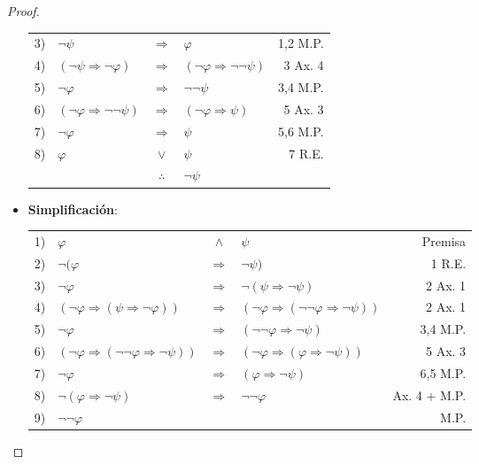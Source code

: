 \documentclass[12pt]{report}
\theoremstyle{largebreak}
\begin{document}
\begin{proof}
\begin{itemize}
\begin{center}
\begin{tabular}{l l c l r}
                    3) & $\neg\psi$ & $\Rightarrow$ & $\varphi$ & 1,2 M.P. \\
                    4) & $(\neg\psi\Rightarrow\neg\varphi)$ & $\Rightarrow$ & $(\neg\varphi\Rightarrow\neg\neg\psi)$ & 3 Ax. 4 \\
                    5) & $\neg\varphi$ & $\Rightarrow$ & $\neg\neg\psi$ & 3,4 M.P. \\
                    6) & $(\neg\varphi\Rightarrow\neg\neg\psi)$ & $\Rightarrow$ & $(\neg\varphi\Rightarrow\psi)$ & 5 Ax. 3 \\
                    7) & $\neg\varphi$ & $\Rightarrow$ & $\psi$ & 5,6 M.P. \\
                    8) & $\varphi$ & $\lor$ & $\psi$ & 7 R.E. \\
                    \hline
                    & & $\therefore$ & $\neg\psi$ & \\
                \end{tabular}
            \end{center}
            \item \textbf{Simplificación}:
            \begin{center}
                \begin{tabular}{l l c l r}
                    1) & $\varphi$ & $\land$ & $\psi$ & Premisa \\
                    2) & $\neg(\varphi$ & $\Rightarrow$ & $\neg\psi)$ & 1 R.E. \\
                    3) & $\neg\varphi$ & $\Rightarrow$ & $\neg(\psi\Rightarrow\neg\psi)$ & 2 Ax. 1 \\
                    4) & $(\neg\varphi\Rightarrow(\psi\Rightarrow\neg\varphi))$ & $\Rightarrow$ & $(\neg\varphi\Rightarrow(\neg\neg\varphi\Rightarrow\neg\psi))$ & 2 Ax. 1 \\
                    5) & $\neg\varphi$ & $\Rightarrow$ & $(\neg\neg\varphi\Rightarrow\neg\psi)$ & 3,4 M.P. \\
                    6) & $(\neg\varphi\Rightarrow(\neg\neg\varphi\Rightarrow\neg\psi))$ & $\Rightarrow$ & $(\neg\varphi\Rightarrow(\varphi\Rightarrow\neg\psi))$ &  5 Ax. 3 \\
                    7) & $\neg\varphi$ & $\Rightarrow$ & $(\varphi\Rightarrow\neg\psi)$ &  6,5 M.P. \\
                    8) & $\neg(\varphi\Rightarrow\neg\psi)$ & $\Rightarrow$ & $\neg\neg\varphi$ &  Ax. 4 + M.P. \\
                    9) & $\neg\neg\varphi$ &  &  &  M.P. \\

\end{tabular}
\end{center}
\end{itemize}
\end{proof}
\end{document}
